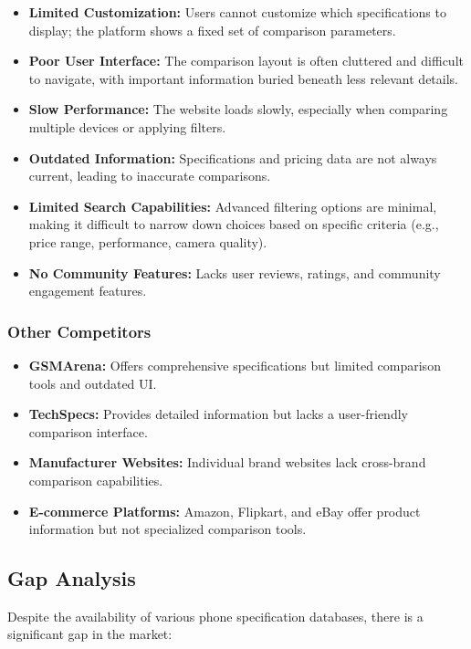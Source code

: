 \documentclass[12pt]{article}
\begin{document}
\begin{itemize}
    \item \textbf{Limited Customization:} Users cannot customize which specifications to display; the platform shows a fixed set of comparison parameters.
    \item \textbf{Poor User Interface:} The comparison layout is often cluttered and difficult to navigate, with important information buried beneath less relevant details.
    \item \textbf{Slow Performance:} The website loads slowly, especially when comparing multiple devices or applying filters.
    \item \textbf{Outdated Information:} Specifications and pricing data are not always current, leading to inaccurate comparisons.
    \item \textbf{Limited Search Capabilities:} Advanced filtering options are minimal, making it difficult to narrow down choices based on specific criteria (e.g., price range, performance, camera quality).
    \item \textbf{No Community Features:} Lacks user reviews, ratings, and community engagement features.
\end{itemize}

\subsubsection{Other Competitors}
\begin{itemize}
    \item \textbf{GSMArena:} Offers comprehensive specifications but limited comparison tools and outdated UI.
    \item \textbf{TechSpecs:} Provides detailed information but lacks a user-friendly comparison interface.
    \item \textbf{Manufacturer Websites:} Individual brand websites lack cross-brand comparison capabilities.
    \item \textbf{E-commerce Platforms:} Amazon, Flipkart, and eBay offer product information but not specialized comparison tools.
\end{itemize}

\subsection{Gap Analysis}
Despite the availability of various phone specification databases, there is a significant gap in the market:
\end{document}
